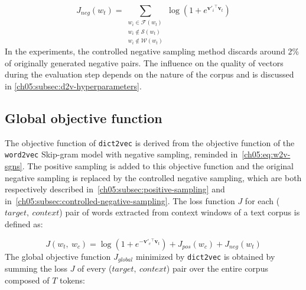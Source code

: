     \begin{equation}
      J_{neg}(w_t) = \sum_{\substack{
                               w_i \in \mathcal{F}(w_t) \\
                               w_i \notin \mathcal{S}(w_t) \\
                               w_i \notin \mathcal{W}(w_t)}}
                     \log(1 + e^{\mathbf{v'}_{i} {}^\top \mathbf{v}_{t}})
    \end{equation}
    In the experiments, the controlled negative sampling method discards around
    2\% of originally generated negative pairs. The influence on the quality of
    vectors during the evaluation step depends on the nature of the corpus and
    is discussed in \autoref{ch05:subsec:d2v-hyperparameters}.

  \subsection{Global objective function}
    \label{ch05:subsec:dict2vec-objective-function}
    The objective function of \texttt{dict2vec} is derived from the objective
    function of the \texttt{word2vec} Skip-gram model with negative sampling,
    reminded in~\autoref{ch05:eq:w2v-sgns}. The positive sampling is added to
    this objective function and the original negative sampling is replaced by
    the controlled negative sampling, which are both respectively described
    in~\autoref{ch05:subsec:positive-sampling} and
    in~\autoref{ch05:subsec:controlled-negative-sampling}. The loss function $J$
    for each ($target,~context$) pair of words extracted from context windows of
    a text corpus is defined as:

    \begin{equation}
      J(w_t,~w_c) = \log(1 + e^{-\mathbf{v'}_{c}{}^\top \mathbf{v}_{t}})
                  + J_{pos}(w_c) + J_{neg}(w_t)
    \end{equation}
    The global objective function $J_{global}$ minimized by \texttt{dict2vec} is
    obtained by summing the loss $J$ of every ($target,~context$) pair over the
    entire corpus composed of $T$ tokens:

